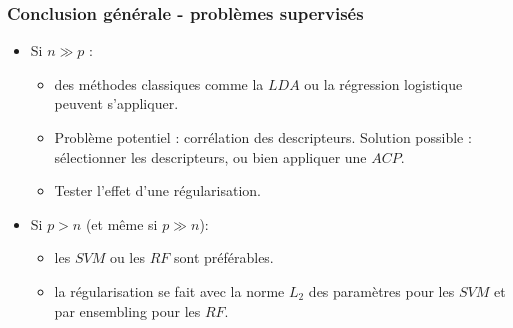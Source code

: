 \begin{frame}
\frametitle{Conclusion générale - problèmes supervisés}
\begin{itemize}
	\item Si $n \gg p$ : 
	\begin{itemize}
		\item des méthodes classiques comme la $LDA$ ou la régression logistique peuvent s'appliquer. 
		\item Problème potentiel : corrélation des descripteurs. Solution possible : sélectionner les descripteurs, ou bien appliquer une $ACP$. 
		\item Tester l'effet d'une régularisation. 
	\end{itemize}
	\item Si $p > n$ (et même si $p \gg n$): 
	\begin{itemize}
		\item les $SVM$ ou les $RF$ sont préférables. 
		\item la régularisation se fait avec la norme $L_2$ des paramètres pour les $SVM$ et par ensembling pour les $RF$. 
	\end{itemize}
\end{itemize}
\end{frame}






